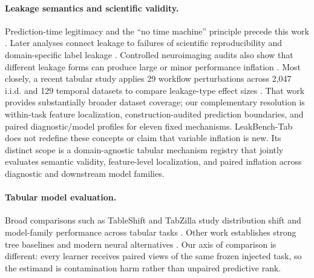 \documentclass[letterpaper]{article}
\begin{document}
\paragraph{Leakage semantics and scientific validity.}
Prediction-time legitimacy and the ``no time machine'' principle precede this
work \citep{kaufman2011leakage}.  Later analyses connect leakage to failures of
scientific reproducibility and domain-specific label leakage
\citep{kapoor2023leakage,davis2024framework}.  Controlled neuroimaging audits
also show that different leakage forms can produce large or minor performance
inflation \citep{rosenblatt2024connectome}.  Most closely, a recent tabular
study applies 29 workflow perturbations across 2,047 i.i.d. and 129 temporal
datasets to compare leakage-type effect sizes \citep{roth2026leakage}.  That
work provides substantially broader dataset coverage; our complementary
resolution is within-task feature localization, construction-audited
prediction boundaries, and paired diagnostic/model profiles for eleven fixed
mechanisms.
LeakBench-Tab does not redefine
these concepts or claim that variable inflation is new.  Its distinct scope is
a domain-agnostic tabular mechanism registry that jointly evaluates semantic
validity, feature-level localization, and paired inflation across diagnostic
and downstream model families.

\paragraph{Tabular model evaluation.}
Broad comparisons such as TableShift and TabZilla study distribution shift and
model-family performance across tabular tasks
\citep{gardner2023tableshift,mcelfresh2023tabzilla}.  Other work establishes
strong tree baselines and modern neural alternatives
\citep{grinsztajn2022trees,gorishniy2025tabm}.  Our axis of comparison is
different: every learner receives paired views of the same frozen injected
task, so the estimand is contamination harm rather than unpaired predictive
rank.
\end{document}
